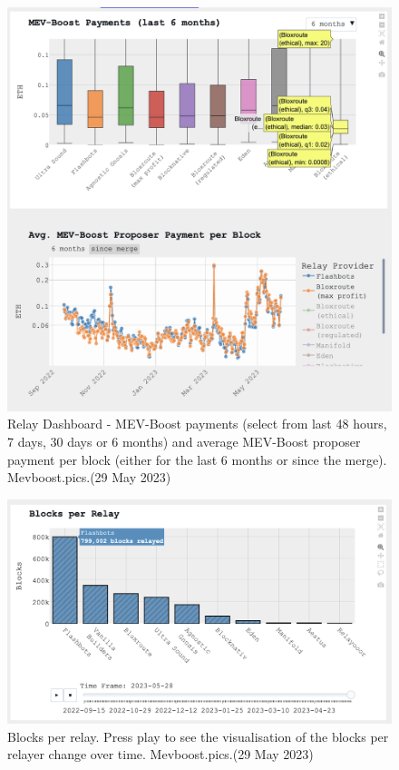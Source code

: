 \documentclass[UTF8]{article}
\begin{document}
{\begin{figure}[htbp]
\begin{center}
\includegraphics[width=0.9\linewidth]{images/mevrelay3}
\caption{Relay Dashboard - MEV-Boost payments (select from last 48 hours, 7 days, 30 days or 6 months) and average MEV-Boost proposer payment per block (either for the last 6 months or since the merge). Mevboost.pics.(29 May 2023)}
\label{fig:mevrelay3}
\end{center}
\end{figure}

\begin{figure}[htbp]
\begin{center}
\includegraphics[width=0.9\linewidth]{images/mevrelay4}
\caption{Blocks per relay. Press play to see the visualisation of the blocks per relayer change over time. Mevboost.pics.(29 May 2023)}
\label{fig:mevrelay4}
\end{center}
\end{figure}

}
\end{document}
